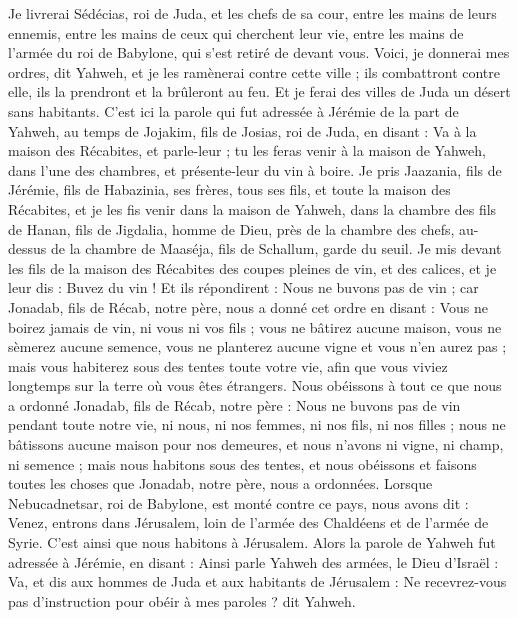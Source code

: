\begin{multicols}{2}
Je livrerai Sédécias, roi de Juda, et les chefs de sa cour, entre les mains de leurs ennemis, entre les mains de ceux qui cherchent leur vie, entre les mains de l'armée du roi de Babylone, qui s'est retiré de devant vous.
Voici, je donnerai mes ordres, dit Yahweh, et je les ramènerai contre cette ville ; ils combattront contre elle, ils la prendront et la brûleront au feu. Et je ferai des villes de Juda un désert sans habitants.
\VerseOne{}C'est ici la parole qui fut adressée à Jérémie de la part de Yahweh, au temps de Jojakim, fils de Josias, roi de Juda, en disant :
Va à la maison des Récabites, et parle-leur ; tu les feras venir à la maison de Yahweh, dans l’une des chambres, et présente-leur du vin à boire.
Je pris Jaazania, fils de Jérémie, fils de Habazinia, ses frères, tous ses fils, et toute la maison des Récabites,
et je les fis venir dans la maison de Yahweh, dans la chambre des fils de Hanan, fils de Jigdalia, homme de Dieu, près de la chambre des chefs, au-dessus de la chambre de Maaséja, fils de Schallum, garde du seuil.
Je mis devant les fils de la maison des Récabites des coupes pleines de vin, et des calices, et je leur dis : Buvez du vin !
Et ils répondirent : Nous ne buvons pas de vin ; car Jonadab, fils de Récab, notre père, nous a donné cet ordre en disant : Vous ne boirez jamais de vin, ni vous ni vos fils ;
vous ne bâtirez aucune maison, vous ne sèmerez aucune semence, vous ne planterez aucune vigne et vous n'en aurez pas ; mais vous habiterez sous des tentes toute votre vie, afin que vous viviez longtemps sur la terre où vous êtes étrangers.
Nous obéissons à tout ce que nous a ordonné Jonadab, fils de Récab, notre père : Nous ne buvons pas de vin pendant toute notre vie, ni nous, ni nos femmes, ni nos fils, ni nos filles ;
nous ne bâtissons aucune maison pour nos demeures, et nous n'avons ni vigne, ni champ, ni semence ;
mais nous habitons sous des tentes, et nous obéissons et faisons toutes les choses que Jonadab, notre père, nous a ordonnées.
Lorsque Nebucadnetsar, roi de Babylone, est monté contre ce pays, nous avons dit : Venez, entrons dans Jérusalem, loin de l'armée des Chaldéens et de l'armée de Syrie. C’est ainsi que nous habitons à Jérusalem.
Alors la parole de Yahweh fut adressée à Jérémie, en disant :
Ainsi parle Yahweh des armées, le Dieu d'Israël : Va, et dis aux hommes de Juda et aux habitants de Jérusalem : Ne recevrez-vous pas d'instruction pour obéir à mes paroles ? dit Yahweh.

\end{multicols}
